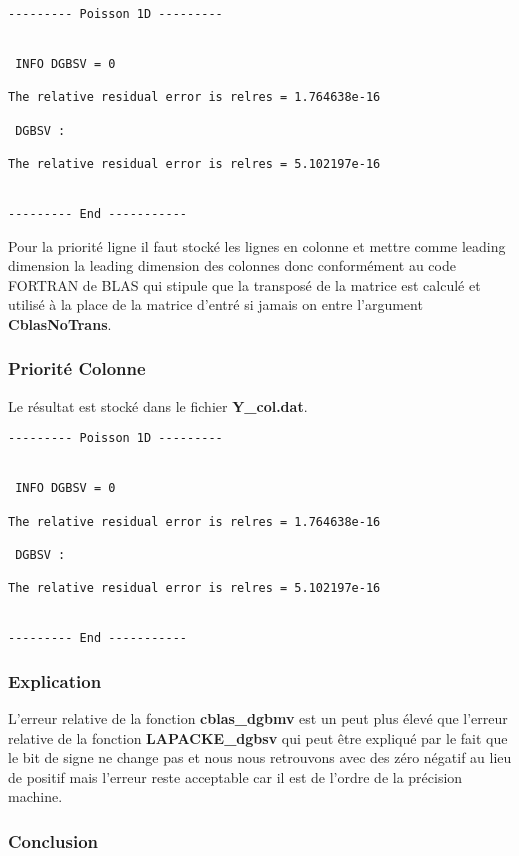 \documentclass[11pt]{article}
\begin{document}
\begin{lstlisting}
--------- Poisson 1D ---------


 INFO DGBSV = 0

The relative residual error is relres = 1.764638e-16

 DGBSV :

The relative residual error is relres = 5.102197e-16


--------- End -----------
\end{lstlisting}

Pour la priorité ligne il faut stocké les lignes en colonne et mettre
comme leading dimension la leading dimension des colonnes donc
conformément au code FORTRAN de BLAS qui stipule que la transposé de
la matrice est calculé et utilisé à la place de la matrice d'entré si
jamais on entre l'argument \textbf{CblasNoTrans}.

\subsubsection{Priorité Colonne}

Le résultat est stocké dans le fichier \textbf{Y\_col.dat}.

\begin{lstlisting}
--------- Poisson 1D ---------


 INFO DGBSV = 0

The relative residual error is relres = 1.764638e-16

 DGBSV :

The relative residual error is relres = 5.102197e-16


--------- End -----------
\end{lstlisting}

\subsubsection{Explication}

L'erreur relative de la fonction \textbf{cblas\_dgbmv} est un peut
plus élevé que l'erreur relative de la fonction
\textbf{LAPACKE\_dgbsv} qui peut être expliqué par le fait que le bit
de signe ne change pas et nous nous retrouvons avec des zéro négatif
au lieu de positif mais l'erreur reste acceptable car il est de
l'ordre de la précision machine.

\subsubsection{Conclusion}
\end{document}

